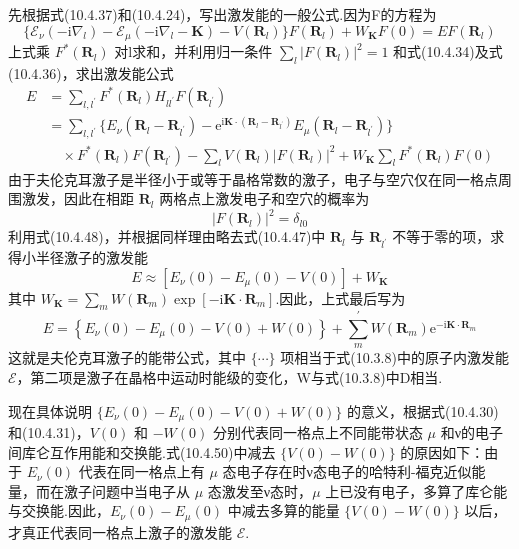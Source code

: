 先根据式(10.4.37)和(10.4.24)，写出激发能的一般公式.因为F的方程为
\begin{equation}
  \bigl\{\mathscr{E}_{\nu}(-\mathrm{i}\nabla_{l})
  -\mathscr{E}_{\mu}(-\mathrm{i}\nabla_{l}-\boldsymbol{K})
  -V(\boldsymbol{R}_{l})\bigr\}F(\boldsymbol{R}_{l})
  +W_{\boldsymbol{K}}F(0)=EF(\boldsymbol{R}_{l})
\end{equation}
上式乘 $F^{*}(\boldsymbol{R}_{l})$ 对l求和，并利用归一条件
$\sum_{l}|F(\boldsymbol{R}_{l})|^{2}=1$ 和式(10.4.34)及式(10.4.36)，求出激发能公式
\begin{equation}
\begin{aligned}
  E&=\sum_{l,l^{\prime}}F^{*}(\boldsymbol{R}_{l})H_{ll^{\prime}}F(\boldsymbol{R}_{l^{\prime}})\\
  &=\sum_{l,l^{\prime}}\bigl\{E_{\nu}(\boldsymbol{R}_{l}-\boldsymbol{R}_{l^{\prime}})
  -\mathrm{e}^{\mathrm{i}\boldsymbol{K}\cdot(\boldsymbol{R}_{l}-\boldsymbol{R}_{l^{\prime}})}
  E_{\mu}(\boldsymbol{R}_{l}-\boldsymbol{R}_{l^{\prime}})\bigr\}\\
  &\quad\times F^{*}(\boldsymbol{R}_{l})F(\boldsymbol{R}_{l^{\prime}})
  -\sum_{l}V(\boldsymbol{R}_{l})|F(\boldsymbol{R}_{l})|^{2}
  +W_{\boldsymbol{K}}\sum_{l}F^{*}(\boldsymbol{R}_{l})F(0)
\end{aligned}
\end{equation}
由于夫伦克耳激子是半径小于或等于晶格常数的激子，电子与空穴仅在同一格点周围激发，因此在相距 $\boldsymbol{R}_{l}$ 两格点上激发电子和空穴的概率为
\begin{equation}
  |F(\boldsymbol{R}_{l})|^{2}=\delta_{l0}
\end{equation}
利用式(10.4.48)，并根据同样理由略去式(10.4.47)中 $\boldsymbol{R}_{l}$ 与 $\boldsymbol{R}_{l^{\prime}}$ 不等于零的项，求得小半径激子的激发能
\begin{equation}
  E\approx\left[E_{\nu}(0)-E_{\mu}(0)-V(0)\right]+W_{\boldsymbol{K}}
\end{equation}
其中 $W_{\boldsymbol{K}}=\sum_{m}W(\boldsymbol{R}_{m})
\exp[-\mathrm{i}\boldsymbol{K}\cdot\boldsymbol{R}_{m}]$.因此，上式最后写为
\begin{equation}
  E=\left\{E_{\nu}(0)-E_{\mu}(0)-V(0)+W(0)\right\}
  +\sum_{m}^{\prime}W(\boldsymbol{R}_{m})\mathrm{e}^{-\mathrm{i}\boldsymbol{K}\cdot\boldsymbol{R}_{m}}
\end{equation}
这就是夫伦克耳激子的能带公式，其中 $\{\cdots\}$ 项相当于式(10.3.8)中的原子内激发能 $\mathscr{E}$，第二项是激子在晶格中运动时能级的变化，W与式(10.3.8)中D相当.

现在具体说明 $\{E_{\nu}(0)-E_{\mu}(0)-V(0)+W(0)\}$ 的意义，根据式(10.4.30)和(10.4.31)，$V(0)$ 和 $-W(0)$ 分别代表同一格点上不同能带状态 $\mu$ 和ν的电子间库仑互作用能和交换能.式(10.4.50)中减去 $\{V(0)-W(0)\}$ 的原因如下：由于 $E_{\nu}(0)$ 代表在同一格点上有 $\mu$ 态电子存在时ν态电子的哈特利-福克近似能量，而在激子问题中当电子从 $\mu$ 态激发至ν态时，$\mu$ 上已没有电子，多算了库仑能与交换能.因此，$E_{\nu}(0)-E_{\mu}(0)$ 中减去多算的能量 $\{V(0)-W(0)\}$ 以后，才真正代表同一格点上激子的激发能 $\mathscr{E}$.

